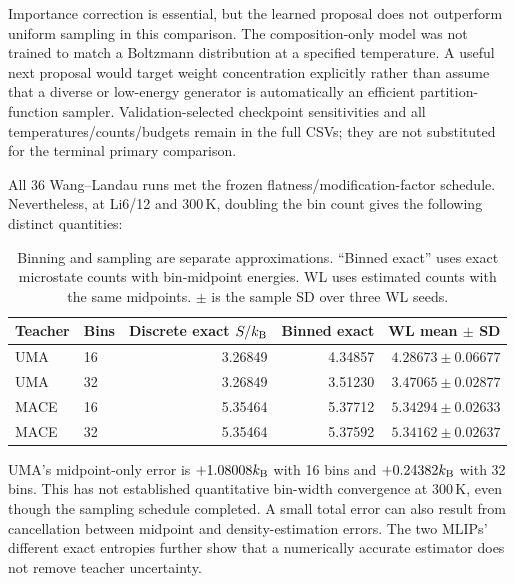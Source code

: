 Importance correction is essential, but the learned proposal does not
outperform uniform sampling in this comparison. The composition-only model
was not trained to match a Boltzmann distribution at a specified temperature.
A useful next proposal would target weight concentration explicitly rather
than assume that a diverse or low-energy generator is automatically an
efficient partition-function sampler. Validation-selected checkpoint
sensitivities and all temperatures/counts/budgets remain in the full CSVs;
they are not substituted for the terminal primary comparison.

All 36 Wang--Landau runs met the frozen flatness/modification-factor
schedule. Nevertheless, at Li6/12 and 300\,K, doubling the bin count gives
the following distinct quantities:
\begin{table}[htbp]
\centering
\caption{Binning and sampling are separate approximations. ``Binned exact''
uses exact microstate counts with bin-midpoint energies. WL uses estimated
counts with the same midpoints. $\pm$ is the sample SD over three WL seeds.}
\begin{tabular}{llrrr}\toprule
Teacher & Bins & Discrete exact $S/k_{\rm B}$ & Binned exact & WL mean $\pm$ SD\\\midrule
UMA & 16 & 3.26849 & 4.34857 & $4.28673\pm0.06677$\\
UMA & 32 & 3.26849 & 3.51230 & $3.47065\pm0.02877$\\
MACE & 16 & 5.35464 & 5.37712 & $5.34294\pm0.02633$\\
MACE & 32 & 5.35464 & 5.37592 & $5.34162\pm0.02637$\\\bottomrule
\end{tabular}
\end{table}
UMA's midpoint-only error is $+1.08008k_{\rm B}$ with 16 bins and
$+0.24382k_{\rm B}$ with 32 bins. This has not established quantitative bin-width
convergence at 300\,K, even though the sampling schedule completed. A small
total error can also result from cancellation between midpoint and
density-estimation errors. The two MLIPs' different exact entropies further
show that a numerically accurate estimator does not remove teacher
uncertainty.


